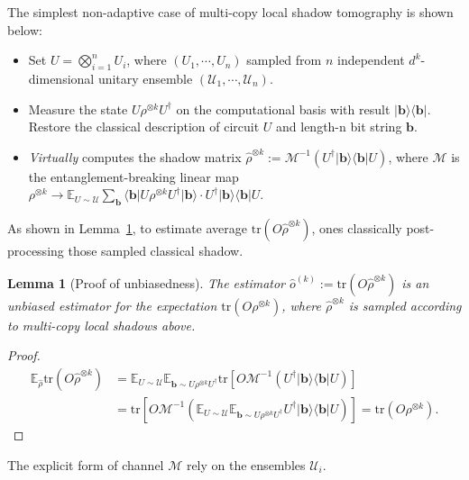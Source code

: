 \documentclass[aps,%
twocolumn,%
floatfix,%
pra,%
amsfonts,%
groupedaddress,%
superscriptaddress]{revtex4-2}%
\newtheorem{lemma}{Lemma}
\newcommand{\bra}[1]{\langle #1\rvert}
\newcommand{\ket}[1]{\lvert #1\rangle}
\newcommand{\1}{\mathbbm{1}}
\begin{document}
The simplest non-adaptive case of multi-copy local shadow tomography is shown below:
\begin{itemize}
    \item Set $U = \bigotimes_{i=1}^n U_i$, where $(U_1,\cdots,U_n)$ sampled from $n$ independent $d^k$-dimensional unitary ensemble $(\mathcal{U}_1,\cdots,\mathcal{U}_n)$.
    \item Measure the state $U \rho^{\otimes k} U^\dagger$ on the computational basis with result $\ket{\mathbf{b}}\!\bra{\mathbf{b}}$. Restore the classical description of circuit $U$ and length-n bit string $\mathbf b$.
    \item \textit{Virtually} computes the shadow matrix $\hat \rho^{\otimes k}:= \mathcal{M}^{-1}(U^\dagger \ket{\mathbf{b}}\!\bra{\mathbf{b}} U)$, where $\mathcal{M}$ is the entanglement-breaking linear map $\rho^{\otimes k} \to \mathbb{E}_{U \sim \mathcal{U}} \sum_{\mathbf b}\bra{\mathbf b}U \rho^{\otimes k} U^\dagger \ket{\mathbf{b}} \cdot  U^\dagger\ket{\mathbf b}\!\bra{\mathbf b} U$.
\end{itemize}
 As shown in Lemma~\ref{lemma:single_shadow_unbiased}, to estimate average $\text{tr}(O \hat{\rho}^{\otimes k})$, ones classically post-processing those sampled classical shadow. 
\begin{lemma}[Proof of unbiasedness]\label{lemma:single_shadow_unbiased}
    The estimator $\hat{o}^{(k)} := \text{tr}(O \hat{\rho}^{\otimes k})$ is an unbiased estimator for the expectation $\text{tr}(O {\rho}^{\otimes k})$, where $\hat{\rho}^{\otimes k}$ is sampled according to multi-copy local shadows above.
\end{lemma}
\begin{proof}
    \begin{align}
        \mathbb{E}_{\hat \rho} \text{tr}(O \hat{\rho}^{\otimes k}) &= \mathbb{E}_{U \sim \mathcal{U}}\mathbb{E}_{\mathbf{b} \sim U \rho^{\otimes k} U^\dagger} \text{tr}\left[O \mathcal{M}^{-1}(U^\dagger \ket{\mathbf{b}}\!\bra{\mathbf{b}} U)\right]\\
        &=  \text{tr}\left[O \mathcal{M}^{-1}(\mathbb{E}_{U\sim \mathcal{U}}\mathbb{E}_{\mathbf{b} \sim U \rho^{\otimes k}  U^\dagger}U^\dagger \ket{\mathbf{b}}\!\bra{\mathbf{b}} U)\right]=\text{tr}(O \rho^{\otimes k}).
    \end{align}
\end{proof}
The explicit form of channel $\mathcal{M}$ rely on the ensembles $\mathcal{U}_i$.
\end{document}
